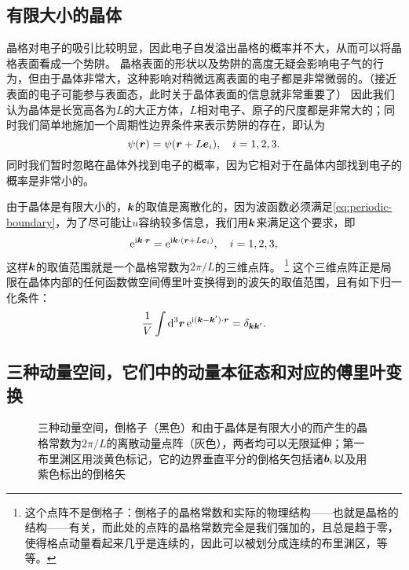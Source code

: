 \subsection{有限大小的晶体}

晶格对电子的吸引比较明显，因此电子自发溢出晶格的概率并不大，从而可以将晶格表面看成一个势阱。
晶格表面的形状以及势阱的高度无疑会影响电子气的行为，但由于晶体非常大，这种影响对稍微远离表面的电子都是非常微弱的。（接近表面的电子可能参与表面态，此时关于晶体表面的信息就非常重要了）
因此我们认为晶体是长宽高各为$L$的大正方体，$L$相对电子、原子的尺度都是非常大的；同时我们简单地施加一个周期性边界条件来表示势阱的存在，即认为
\begin{equation}
    \psi(\vb*{r}) = \psi(\vb*{r} + L \vb*{e}_i), \quad i = 1, 2, 3.
    \label{eq:periodic-boundary}
\end{equation}
同时我们暂时忽略在晶体外找到电子的概率，因为它相对于在晶体内部找到电子的概率是非常小的。

由于晶体是有限大小的，$\vb*{k}$的取值是离散化的，因为波函数必须满足\eqref{eq:periodic-boundary}，为了尽可能让$u$容纳较多信息，我们用$\vb*{k}$来满足这个要求，即
\[
    \mathrm{e}^{\mathrm{i} \vb*{k} \cdot \vb*{r}} = \mathrm{e}^{\mathrm{i} \vb*{k} \cdot (\vb*{r} + L \vb*{e}_i)}, \quad i = 1, 2, 3,
\]
这样$\vb*{k}$的取值范围就是一个晶格常数为$2\pi / L$的三维点阵。%
\footnote{这个点阵不是倒格子：倒格子的晶格常数和实际的物理结构——也就是晶格的结构——有关，而此处的点阵的晶格常数完全是我们强加的，且总是趋于零，使得格点动量看起来几乎是连续的，因此可以被划分成连续的布里渊区，等等。
}%
这个三维点阵正是局限在晶体内部的任何函数做空间傅里叶变换得到的波矢的取值范围，且有如下归一化条件：
\begin{equation}
    \frac{1}{V} \int \dd[3]{\vb*{r}} \mathrm{e}^{\mathrm{i} (\vb*{k} - \vb*{k}') \cdot \vb*{r}} = \delta_{\vb*{k}\vb*{k}'}.
\end{equation}

\subsection{三种动量空间，它们中的动量本征态和对应的傅里叶变换}\label{sec:momentum-space-inner-product}

\begin{figure}
    \centering
    
    \caption{三种动量空间，倒格子（黑色）和由于晶体是有限大小的而产生的晶格常数为$2\pi / L$的离散动量点阵（灰色），两者均可以无限延伸；第一布里渊区用淡黄色标记，它的边界垂直平分的倒格矢包括诸$\vb*{b}_i$以及用紫色标出的倒格矢}
\end{figure}

